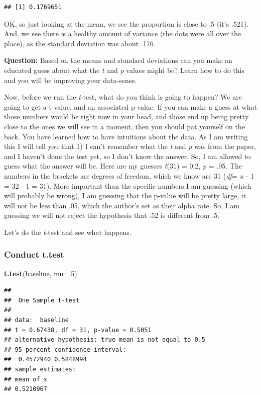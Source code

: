 \documentclass[
]{book}
\newenvironment{Shaded}{\begin{snugshade}}{\end{snugshade}}
\newcommand{\AttributeTok}[1]{\textcolor[rgb]{0.13,0.29,0.53}{#1}}
\newcommand{\DecValTok}[1]{\textcolor[rgb]{0.00,0.00,0.81}{#1}}
\newcommand{\FunctionTok}[1]{\textcolor[rgb]{0.13,0.29,0.53}{\textbf{#1}}}
\newcommand{\NormalTok}[1]{#1}
\begin{document}
\begin{verbatim}
## [1] 0.1769651
\end{verbatim}

OK, so just looking at the mean, we see the proportion is close to .5 (it's .521). And, we see there is a healthy amount of variance (the dots were all over the place), as the standard deviation was about .176.

\textbf{Question:} Based on the means and standard deviations can you make an educated guess about what the \emph{t} and \emph{p} values might be? Learn how to do this and you will be improving your data-sense.

Now, before we run the \emph{t}-test, what do you think is going to happen? We are going to get a t-value, and an associated p-value. If you can make a guess at what those numbers would be right now in your head, and those end up being pretty close to the ones we will see in a moment, then you should pat yourself on the back. You have learned how to have intuitions about the data. As I am writing this I will tell you that 1) I can't remember what the \emph{t} and \emph{p} was from the paper, and I haven't done the test yet, so I don't know the answer. So, I am allowed to guess what the answer will be. Here are my guesses \emph{t}(31) = 0.2, \emph{p} = .95. The numbers in the brackets are degrees of freedom, which we know are 31 (\emph{df}= \emph{n} - 1 = 32 - 1 = 31). More important than the specific numbers I am guessing (which will probably be wrong), I am guessing that the p-value will be pretty large, it will not be less than .05, which the author's set as their alpha rate. So, I am guessing we will not reject the hypothesis that .52 is different from .5.

Let's do the \emph{t}-test and see what happens.

\hypertarget{conduct-t.test}{%
\subsubsection{Conduct t.test}\label{conduct-t.test}}

\begin{Shaded}
\begin{Highlighting}[]
\FunctionTok{t.test}\NormalTok{(baseline, }\AttributeTok{mu=}\NormalTok{.}\DecValTok{5}\NormalTok{)}
\end{Highlighting}
\end{Shaded}

\begin{verbatim}
## 
##  One Sample t-test
## 
## data:  baseline
## t = 0.67438, df = 31, p-value = 0.5051
## alternative hypothesis: true mean is not equal to 0.5
## 95 percent confidence interval:
##  0.4572940 0.5848994
## sample estimates:
## mean of x 
## 0.5210967
\end{verbatim}
\end{document}
